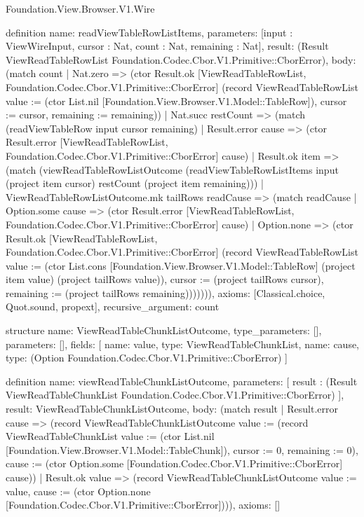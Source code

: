 \begin{lexlean}{Foundation.View.Browser.V1.Wire}
\begin{semanticmodule}
definition{
  name: readViewTableRowListItems,
  parameters: [input : ViewWireInput, cursor : Nat, count : Nat, remaining : Nat],
  result: (Result ViewReadTableRowList Foundation.Codec.Cbor.V1.Primitive::CborError),
  body: (match count
    | Nat.zero => (ctor Result.ok [ViewReadTableRowList, Foundation.Codec.Cbor.V1.Primitive::CborError] (record ViewReadTableRowList {value := (ctor List.nil [Foundation.View.Browser.V1.Model::TableRow]), cursor := cursor, remaining := remaining}))
    | Nat.succ restCount => (match (readViewTableRow input cursor remaining)
      | Result.error cause => (ctor Result.error [ViewReadTableRowList, Foundation.Codec.Cbor.V1.Primitive::CborError] cause)
      | Result.ok item => (match (viewReadTableRowListOutcome (readViewTableRowListItems input (project item cursor) restCount (project item remaining)))
        | ViewReadTableRowListOutcome.mk tailRows readCause => (match readCause
          | Option.some cause => (ctor Result.error [ViewReadTableRowList, Foundation.Codec.Cbor.V1.Primitive::CborError] cause)
          | Option.none => (ctor Result.ok [ViewReadTableRowList, Foundation.Codec.Cbor.V1.Primitive::CborError] (record ViewReadTableRowList {value := (ctor List.cons [Foundation.View.Browser.V1.Model::TableRow] (project item value) (project tailRows value)), cursor := (project tailRows cursor), remaining := (project tailRows remaining)})))))),
  axioms: [Classical.choice, Quot.sound, propext],
  recursive_argument: count
}

structure{
  name: ViewReadTableChunkListOutcome,
  type_parameters: [],
  parameters: [],
  fields: [
    {name: value, type: ViewReadTableChunkList},
    {name: cause, type: (Option Foundation.Codec.Cbor.V1.Primitive::CborError)}
  ]
}

definition{
  name: viewReadTableChunkListOutcome,
  parameters: [
    result : (Result ViewReadTableChunkList Foundation.Codec.Cbor.V1.Primitive::CborError)
  ],
  result: ViewReadTableChunkListOutcome,
  body: (match result
    | Result.error cause => (record ViewReadTableChunkListOutcome {value := (record ViewReadTableChunkList {value := (ctor List.nil [Foundation.View.Browser.V1.Model::TableChunk]), cursor := 0, remaining := 0}), cause := (ctor Option.some [Foundation.Codec.Cbor.V1.Primitive::CborError] cause)})
    | Result.ok value => (record ViewReadTableChunkListOutcome {value := value, cause := (ctor Option.none [Foundation.Codec.Cbor.V1.Primitive::CborError])})),
  axioms: []
}


\end{semanticmodule}
\end{lexlean}
